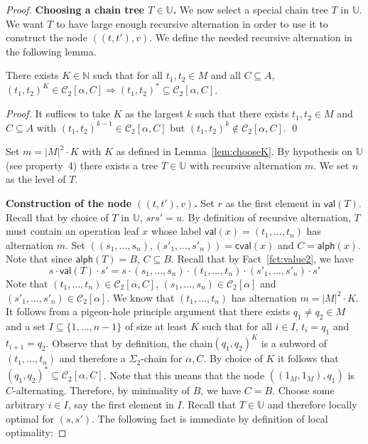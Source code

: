 \documentclass[envcountsame]{llncs}
\newcommand\nat{\ensuremath{\mathbb{N}}\xspace}
\newcommand\Cs{\ensuremath{\mathcal{C}}\xspace}
\newcommand\Cslev[1]{\ensuremath{\Cs_{#1}}\xspace}
\newcommand\Cstwo{\ensuremath{\Cs_2}\xspace}
\newcommand\crr{\ensuremath{\mathbb{U}}\xspace}
\newcommand{\sic}[1]{\ensuremath{\Sigma_{#1}}\xspace}
\newcommand\content[1]{\ensuremath{\contentmorphism(#1)}}
\newcommand\contentmorphism{\ensuremath{\textsf{alph}}}
\newcommand\val[1]{\ensuremath{\textsf{val}(#1)\xspace}}
\newcommand\cval[1]{\ensuremath{\textsf{cval}(#1)\xspace}}
\newcommand\chain{chain\xspace}
\newcommand\qchain[1]{\ensuremath{\sic{#1}}-chain\xspace}
\newcommand\dchain{\qchain{2}}
\begin{document}
\begin{proof}
  \medskip
  \noindent
  {\bf Choosing a \chain tree $T \in \crr$.} We now select a special
  \chain tree $T$ in \crr. We want $T$ to have large enough recursive
  alternation in order to use it to construct the node 
  $((t,t'),v)$. We define the needed recursive alternation in the
  following lemma.

  \begin{lemma} \label{lem:chooseK}
    There exists $K \in \nat$ such that for all $t_1,t_2 \in M$ and all $C
    \subseteq A$, $(t_1,t_2)^K \in \Cslev 2[\alpha,C] \Rightarrow (t_1,t_2)^*
    \subseteq \Cslev 2[\alpha,C]$.
  \end{lemma}

  \begin{proof}
    It suffices to take $K$ as the largest $k$ such that there exists
    $t_1,t_2 \in M$ and $C \subseteq A$ with $(t_1,t_2)^{k-1} \in
    \Cslev 2[\alpha,C]$ but $(t_1,t_2)^{k} \not\in \Cslev 2[\alpha,C]$. \qed
  \end{proof}

  Set $m = |M|^2 \cdot K$ with $K$ as defined in
  Lemma~\ref{lem:chooseK}. By hypothesis on \crr (see property~4) there
  exists a tree $T \in \crr$  with recursive alternation $m$. We set $n$
  as the level of $T$.

  \medskip
  \noindent
  {\bf Construction of the node $((t,t'),v)$.} Set $r$ as the first
  element in \val{T}. Recall that by choice of $T$ in \crr, $srs' = u$. 
  By definition of recursive alternation, $T$ must contain an operation
  leaf $x$ whose label $\val{x} = (t_1,\dots,t_{n})$ has alternation
  $m$. Set $((s_1,\dots,s_n),(s'_1,\dots,s'_n)) = \cval{x}$ and $C =
  \content{x}$. Note that since $\content{T} = B$, $C \subseteq
  B$. Recall that by Fact~\ref{fct:value2}, we have 
  \[
  s \cdot \val{T} \cdot s' = s \cdot (s_1,\dots,s_n) \cdot
  (t_1,\dots,t_{n}) \cdot (s'_1,\dots,s'_n) \cdot s'
  \]
  Note that $(t_1,\dots,t_{n}) \in \Cstwo[\alpha,C]$, $(s_1,\dots,s_n) \in
  \Cstwo[\alpha]$ and $(s'_1,\dots,s'_n) \in \Cstwo[\alpha]$. We know that
  $(t_1,\dots,t_{n})$ has alternation $m = |M|^2 \cdot K$. It follows
  from a pigeon-hole principle argument that there exists $q_1 \neq q_2
  \in M$ and a set $I \subseteq  \{1,\dots,n-1\}$ of size at least $K$
  such that for all $i \in I$, $t_i = q_1$ and $t_{i+1} = q_2$. Observe
  that by definition, the \chain $(q_1,q_2)^{K}$ is a subword of
  $(t_1,\dots,t_{n})$ and therefore a \dchain for $\alpha,C$. By choice
  of $K$ it follows that $(q_1,q_2)^{*} \subseteq \Cstwo[\alpha,C]$. Note
  that this means that the node $((1_M,1_M),q_1)$ is
  $C$-alternating. Therefore, by minimality of $B$, we have $C = B$.
  Choose some arbitrary $i \in I$, say the first element in $I$. Recall
  that $T \in \crr$ and therefore locally optimal for
  $(s,s')$. The following fact is immediate by definition of local
  optimality: 


\end{proof}
\end{document}
